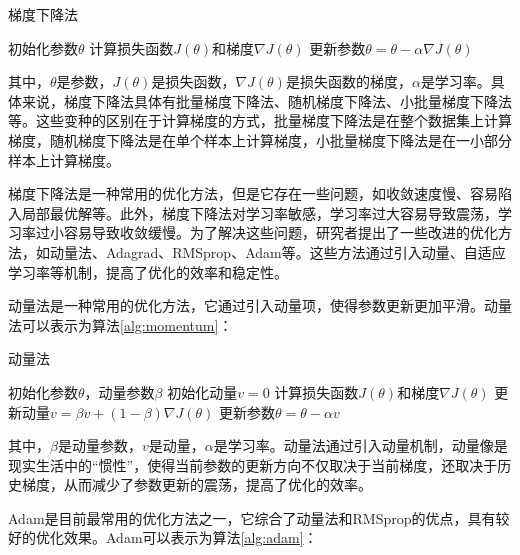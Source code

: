 \begin{algorithm}[H]
    \caption{梯度下降法}
    \label{alg:gd}
    \begin{algorithmic}[1]
        \State 初始化参数$\theta$
            \State 计算损失函数$J(\theta)$和梯度$\nabla J(\theta)$
            \State 更新参数$\theta = \theta - \alpha \nabla J(\theta)$
        \EndWhile
    \end{algorithmic}
\end{algorithm}

其中，$\theta$是参数，$J(\theta)$是损失函数，$\nabla J(\theta)$是损失函数的梯度，$\alpha$是学习率。具体来说，梯度下降法具体有批量梯度下降法、随机梯度下降法、小批量梯度下降法等。这些变种的区别在于计算梯度的方式，批量梯度下降法是在整个数据集上计算梯度，随机梯度下降法是在单个样本上计算梯度，小批量梯度下降法是在一小部分样本上计算梯度。

梯度下降法是一种常用的优化方法，但是它存在一些问题，如收敛速度慢、容易陷入局部最优解等。此外，梯度下降法对学习率敏感，学习率过大容易导致震荡，学习率过小容易导致收敛缓慢。为了解决这些问题，研究者提出了一些改进的优化方法，如动量法、Adagrad、RMSprop、Adam等。这些方法通过引入动量、自适应学习率等机制，提高了优化的效率和稳定性。

动量法是一种常用的优化方法，它通过引入动量项，使得参数更新更加平滑。动量法可以表示为算法\ref{alg:momentum}：

\begin{algorithm}[H]
    \caption{动量法}
    \label{alg:momentum}
    \begin{algorithmic}[1]
        \State 初始化参数$\theta$，动量参数$\beta$
        \State 初始化动量$v = 0$
            \State 计算损失函数$J(\theta)$和梯度$\nabla J(\theta)$
            \State 更新动量$v = \beta v + (1 - \beta) \nabla J(\theta)$
            \State 更新参数$\theta = \theta - \alpha v$
        \EndWhile
    \end{algorithmic}
\end{algorithm}

其中，$\beta$是动量参数，$v$是动量，$\alpha$是学习率。动量法通过引入动量机制，动量像是现实生活中的“惯性”，使得当前参数的更新方向不仅取决于当前梯度，还取决于历史梯度，从而减少了参数更新的震荡，提高了优化的效率。

Adam是目前最常用的优化方法之一，它综合了动量法和RMSprop的优点，具有较好的优化效果。Adam可以表示为算法\ref{alg:adam}：

